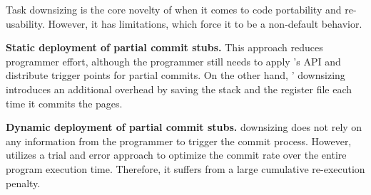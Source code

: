 Task downsizing is the core novelty of \sys when it comes to code portability and re-usability. However, it has limitations, which force  it to be a non-default \sys behavior. 

\textbf{Static deployment of partial commit stubs.} This approach reduces programmer effort, although the programmer still needs to apply \sys's API and distribute trigger points for partial commits. On the other hand, \sys' downsizing introduces an additional overhead by saving the stack and the register file each time it commits the pages. 

\textbf{Dynamic deployment of partial commit stubs.} \sys downsizing does not rely on any information from the programmer to trigger the commit process. However, \sys utilizes a trial and error approach to optimize the commit rate over the entire program execution time. Therefore, it suffers from a large cumulative re-execution penalty.